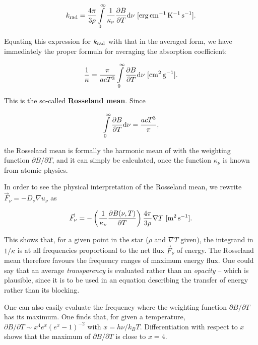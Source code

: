 \documentclass[a4paper,10pt]{article}
\begin{document}
\begin{align*}
    k_{\rm rad} = \frac{4\pi}{3\rho} \int\limits_0^\infty \frac{1}{\kappa_\nu} \frac{\partial B}{\partial T} {\rm d}\nu ~ [{\rm erg\,cm^{-1}\,K^{-1}\,s^{-1}}].
\end{align*}

{\noindent}Equating this expression for $k_{\rm rad}$ with that in the averaged form, we have immediately the proper formula for averaging the absorption coefficient:

\begin{align*}
    \frac{1}{\kappa} = \frac{\pi}{acT^3} \int\limits_0^\infty \frac{\partial B}{\partial T} {\rm d}\nu ~ [{\rm cm^2\,g^{-1}}].
\end{align*}

{\noindent}This is the so-called \textbf{Rosseland mean}. Since

\begin{align*}
    \int\limits_0^\infty \frac{\partial B}{\partial T}{\rm d}\nu = \frac{acT^3}{\pi},
\end{align*}

{\noindent}the Rosseland mean is formally the harmonic mean of    with the weighting function $\partial B/\partial T$, and it can simply be calculated, once the function $\kappa_\nu$ is known from atomic physics.

{\noindent}In order to see the physical interpretation of the Rosseland mean, we rewrite $\vec{F}_\nu=-D_\nu\nabla u_\nu$ as

\begin{align*}
    \vec{F}_\nu = -\left(\frac{1}{\kappa_\nu}\frac{\partial B(\nu,T)}{\partial T}\right)\frac{4\pi}{3\rho}\nabla T ~ [{\rm m^2\,s^{-1}}].
\end{align*}

{\noindent}This shows that, for a given point in the star ($\rho$ and $\nabla T$ given), the integrand in $1/\kappa$ is at all frequencies proportional to the net flux $\vec{F}_\nu$ of energy. The Rosseland mean therefore favours the frequency ranges of maximum energy flux. One could say that an average \textit{transparency} is evaluated rather than an \textit{opacity} -- which is plausible, since it is to be used in an equation describing the transfer of energy rather than its blocking.

{\noindent}One can also easily evaluate the frequency where the weighting function $\partial B/\partial T$ has its maximum. One finds that, for given a temperature, $\partial B/\partial T\sim x^4e^x(e^x-1)^{-2}$ with $x=h\nu/k_BT$. Differentiation with respect to $x$ shows that the maximum of $\partial B/\partial T$ is close to $x=4$.
\end{document}
